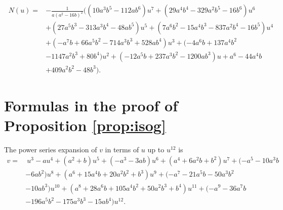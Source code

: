 \documentclass{gtpart}
\theoremstyle{definition}
\theoremstyle{remark}
\numberwithin{equation}{section}
\numberwithin{thm}{section}
\begin{document}
\begin{equation*}
\begin{split}
~  N(u) = & -\frac{1}{a (a^2 - 16 b)^2} \big( (10 a^3 b^5 - 112 a b^6) u^7 + (29 a^4 b^4 - 329 a^2 b^5 - 16 b^6) u^6 \\
          & + (27 a^5 b^3 - 313 a^3 b^4 - 48 a b^5 ) u^5 + (7 a^6 b^2 - 15 a^4 b^3 - 837 a^2 b^4 - 16 b^5) u^4 \\
          & + (-a^7 b + 66 a^5 b^2 - 714 a^3 b^3 + 528 a b^4) u^3 + (-4 a^6 b + 137 a^4 b^2 \\
          & - 1147 a^2 b^3 + 80 b^4) u^2 + (-12 a^5 b + 237 a^3 b^2 - 1200 a b^3) u + a^6 - 44 a^4 b \\
          & + 409 a^2 b^2 - 48 b^3 \big).  
\end{split}
\end{equation*}


\section{Formulas in the proof of Proposition \ref{prop:isog}}
\label{apx:isog}

The power series expansion of $v$ in terms of $u$ up to $u^{12}$ is 
\begin{equation*}
\begin{split}
 v = & ~ u^3 - a u^4 + (a^2 + b) u^5 + (-a^3 - 3 a b) u^6 + (a^4 + 6 a^2 b + b^2) u^7 + (-a^5 - 10 a^3 b \\
     & - 6 a b^2) u^8 + (a^6 + 15 a^4 b + 20 a^2 b^2 + b^3) u^9 + (-a^7 - 21 a^5 b - 50 a^3 b^2 \\
     & - 10 a b^3) u^{10} + (a^8 + 28 a^6 b + 105 a^4 b^2 + 50 a^2 b^3 + b^4) u^{11} + (-a^9 - 36 a^7 b \\
     & - 196 a^5 b^2 - 175 a^3 b^3 - 15 a b^4) u^{12}.  
\end{split}
\end{equation*}
\end{document}
